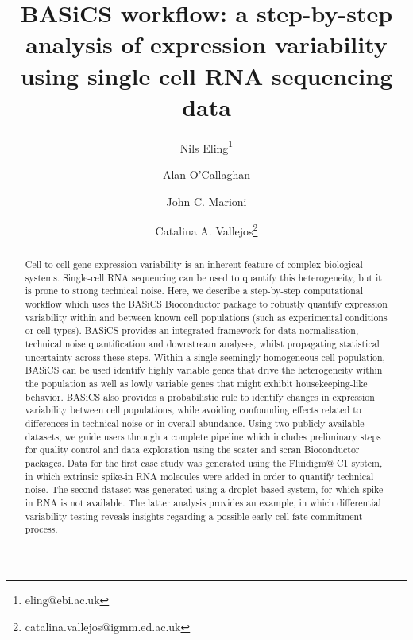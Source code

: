 \documentclass[9pt,a4paper,]{extarticle}
\begin{document}
\pagestyle{front}

\title{BASiCS workflow: a step-by-step analysis of expression variability using single cell RNA sequencing data}

\author[1,2]{Nils Eling\thanks{\ttfamily eling@ebi.ac.uk}}
\author[3]{Alan O'Callaghan}
\author[1,2]{John C. Marioni}
\author[3,4]{Catalina A. Vallejos\thanks{\ttfamily catalina.vallejos@igmm.ed.ac.uk}}

\maketitle
\thispagestyle{front}

\begin{abstract}
Cell-to-cell gene expression variability is an inherent feature of complex
biological systems. Single-cell RNA sequencing can be used to quantify this
heterogeneity, but it is prone to strong technical noise. Here, we describe a
step-by-step computational workflow which uses the BASiCS Bioconductor package
to robustly quantify expression variability within and between known cell
populations (such as experimental conditions or cell types). BASiCS provides
an integrated framework for data normalisation, technical noise quantification
and downstream analyses, whilst propagating statistical uncertainty across
these steps. Within a single seemingly homogeneous cell population, BASiCS
can be used identify highly variable genes that drive the heterogeneity
within the population as well as lowly variable genes that might exhibit
housekeeping-like behavior. BASiCS also provides a probabilistic rule to
identify changes in expression variability between cell populations, while
avoiding confounding effects related to differences in technical noise or in
overall abundance. Using two publicly available datasets, we guide users
through a complete pipeline which includes preliminary steps for quality
control and data exploration using the scater and scran Bioconductor packages.
Data for the first case study was generated using the Fluidigm@ C1 system, in
which extrinsic spike-in RNA molecules were added in order to quantify
technical noise. The second dataset was generated using a droplet-based
system, for which spike-in RNA is not available. The latter analysis provides
an example, in which differential variability testing reveals insights
regarding a possible early cell fate commitment process.
\end{abstract}
\end{document}
